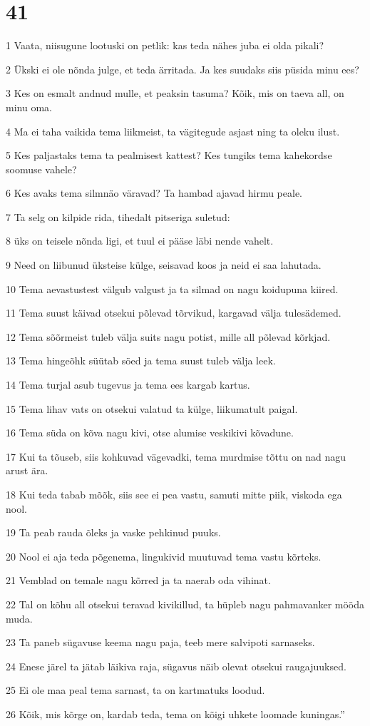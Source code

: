 \chapter{41}

\par 1 Vaata, niisugune lootuski on petlik: kas teda nähes juba ei olda pikali?
\par 2 Ükski ei ole nõnda julge, et teda ärritada. Ja kes suudaks siis püsida minu ees?
\par 3 Kes on esmalt andnud mulle, et peaksin tasuma? Kõik, mis on taeva all, on minu oma.
\par 4 Ma ei taha vaikida tema liikmeist, ta vägitegude asjast ning ta oleku ilust.
\par 5 Kes paljastaks tema ta pealmisest kattest? Kes tungiks tema kahekordse soomuse vahele?
\par 6 Kes avaks tema silmnäo väravad? Ta hambad ajavad hirmu peale.
\par 7 Ta selg on kilpide rida, tihedalt pitseriga suletud:
\par 8 üks on teisele nõnda ligi, et tuul ei pääse läbi nende vahelt.
\par 9 Need on liibunud üksteise külge, seisavad koos ja neid ei saa lahutada.
\par 10 Tema aevastustest välgub valgust ja ta silmad on nagu koidupuna kiired.
\par 11 Tema suust käivad otsekui põlevad tõrvikud, kargavad välja tulesädemed.
\par 12 Tema sõõrmeist tuleb välja suits nagu potist, mille all põlevad kõrkjad.
\par 13 Tema hingeõhk süütab söed ja tema suust tuleb välja leek.
\par 14 Tema turjal asub tugevus ja tema ees kargab kartus.
\par 15 Tema lihav vats on otsekui valatud ta külge, liikumatult paigal.
\par 16 Tema süda on kõva nagu kivi, otse alumise veskikivi kõvadune.
\par 17 Kui ta tõuseb, siis kohkuvad vägevadki, tema murdmise tõttu on nad nagu arust ära.
\par 18 Kui teda tabab mõõk, siis see ei pea vastu, samuti mitte piik, viskoda ega nool.
\par 19 Ta peab rauda õleks ja vaske pehkinud puuks.
\par 20 Nool ei aja teda põgenema, lingukivid muutuvad tema vastu kõrteks.
\par 21 Vemblad on temale nagu kõrred ja ta naerab oda vihinat.
\par 22 Tal on kõhu all otsekui teravad kivikillud, ta hüpleb nagu pahmavanker mööda muda.
\par 23 Ta paneb sügavuse keema nagu paja, teeb mere salvipoti sarnaseks.
\par 24 Enese järel ta jätab läikiva raja, sügavus näib olevat otsekui raugajuuksed.
\par 25 Ei ole maa peal tema sarnast, ta on kartmatuks loodud.
\par 26 Kõik, mis kõrge on, kardab teda, tema on kõigi uhkete loomade kuningas.”

